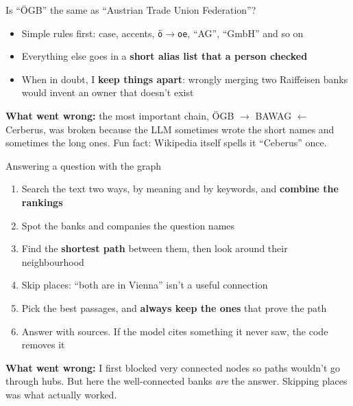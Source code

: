 \documentclass[aspectratio=169,11pt]{beamer}
\newcommand{\hl}[1]{\textcolor{midblue}{\textbf{#1}}}
\newcommand{\story}[1]{\par\vspace{6pt}\small\textcolor{softred}{\textbf{What went wrong:}} #1}
\begin{document}
\begin{frame}{Is ``ÖGB'' the same as ``Austrian Trade Union Federation''?}
  \begin{itemize}
    \item Simple rules first: case, accents, \texttt{\"o}$\rightarrow$\texttt{oe}, ``AG'', ``GmbH'' and so on
    \item Everything else goes in a \hl{short alias list that a person checked}
    \item When in doubt, I \hl{keep things apart}: wrongly merging two Raiffeisen banks
          would invent an owner that doesn't exist
  \end{itemize}
  \story{the most important chain, ÖGB $\rightarrow$ BAWAG $\leftarrow$ Cerberus, was broken
    because the LLM sometimes wrote the short names and sometimes the long ones.
    Fun fact: Wikipedia itself spells it ``Ceberus'' once.}
\end{frame}

\begin{frame}{Answering a question with the graph}
  \begin{enumerate}
    \item Search the text two ways, by meaning and by keywords, and \hl{combine the rankings}
    \item Spot the banks and companies the question names
    \item Find the \hl{shortest path} between them, then look around their neighbourhood
    \item Skip places: ``both are in Vienna'' isn't a useful connection
    \item Pick the best passages, and \hl{always keep the ones} that prove the path
    \item Answer with sources. If the model cites something it never saw, the code removes it
  \end{enumerate}
  \story{I first blocked very connected nodes so paths wouldn't go through hubs. But here the
    well-connected banks \emph{are} the answer. Skipping places was what actually worked.}
\end{frame}
\end{document}
